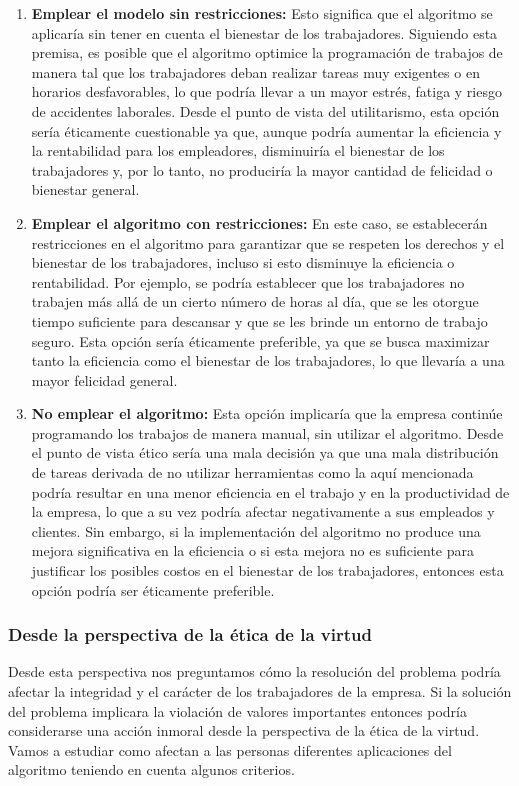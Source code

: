 \begin{enumerate}
    \item \textbf{Emplear el modelo sin restricciones:} Esto significa que el algoritmo 
    se aplicaría sin tener en cuenta el bienestar de los trabajadores. Siguiendo esta premisa, 
    es posible que el algoritmo optimice la programación de trabajos de manera tal que los 
    trabajadores deban realizar tareas muy exigentes o en horarios desfavorables, lo que podría 
    llevar a un mayor estrés, fatiga y riesgo de accidentes laborales. Desde el punto de vista del 
    utilitarismo, esta opción sería éticamente cuestionable ya que, aunque podría aumentar la 
    eficiencia y la rentabilidad para los empleadores, disminuiría el bienestar de los trabajadores 
    y, por lo tanto, no produciría la mayor cantidad de felicidad o bienestar general.

    \item \textbf{Emplear el algoritmo con restricciones:} En este caso, se establecerán restricciones 
    en el algoritmo para garantizar que se respeten los derechos y el bienestar de los trabajadores, 
    incluso si esto disminuye la eficiencia o rentabilidad. Por ejemplo, se podría establecer que los 
    trabajadores no trabajen más allá de un cierto número de horas al día, que se les otorgue tiempo 
    suficiente para descansar y que se les brinde un entorno de trabajo seguro. Esta opción sería 
    éticamente preferible, ya que se busca maximizar tanto la eficiencia como el bienestar de los 
    trabajadores, lo que llevaría a una mayor felicidad general.

    \item \textbf{No emplear el algoritmo:} Esta opción implicaría que la empresa continúe 
    programando los trabajos de manera manual, sin utilizar el algoritmo. Desde el punto de vista 
    ético sería una mala decisión ya que una mala distribución de tareas derivada de no utilizar 
    herramientas como la aquí mencionada podría resultar en una menor eficiencia en el trabajo 
    y en la productividad de la empresa, lo que a su vez podría afectar negativamente a sus 
    empleados y clientes. Sin embargo, si la implementación del algoritmo no produce una mejora 
    significativa en la eficiencia o si esta mejora no es suficiente para justificar los posibles 
    costos en el bienestar de los trabajadores, entonces esta opción podría ser éticamente preferible.
\end{enumerate}

\subsubsection{Desde la perspectiva de la ética de la virtud}
Desde esta perspectiva nos preguntamos cómo la resolución del problema podría afectar la 
integridad y el carácter de los trabajadores de la empresa. Si la solución del problema 
implicara la violación de valores importantes entonces podría considerarse una acción inmoral 
desde la perspectiva de la ética de la virtud. Vamos a estudiar como afectan a las personas 
diferentes aplicaciones del algoritmo teniendo en cuenta algunos criterios.

